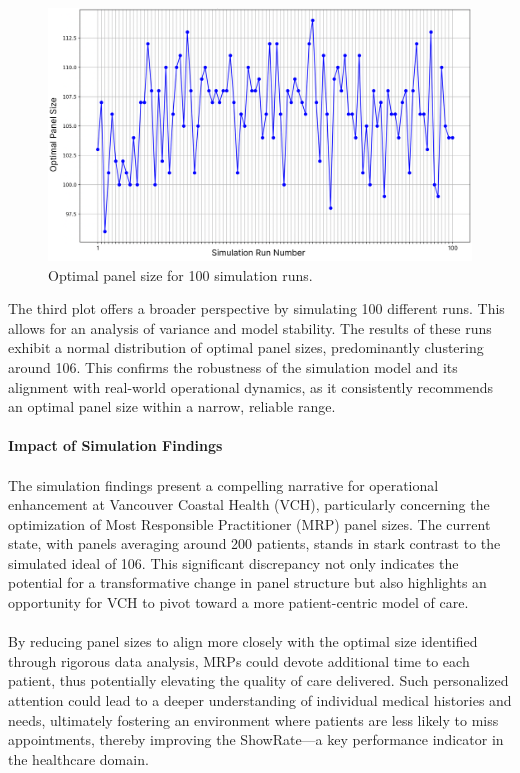 \documentclass[11pt]{article}
\theoremstyle{definition}
\begin{document}
\begin{figure}[H]
    \centering
    \includegraphics[width=1\textwidth]{sim100runs.png}
    \caption{Optimal panel size for 100 simulation runs.}
    \label{fig:show_rate}
\end{figure}
The third plot offers a broader perspective by simulating 100 different runs. This allows for an analysis of variance and model stability. The results of these runs exhibit a normal distribution of optimal panel sizes, predominantly clustering around 106. This confirms the robustness of the simulation model and its alignment with real-world operational dynamics, as it consistently recommends an optimal panel size within a narrow, reliable range.\\\\
\textbf{Impact of Simulation Findings}\\\\
The  simulation findings present a compelling narrative for operational enhancement at Vancouver Coastal Health (VCH), particularly concerning the optimization of Most Responsible Practitioner (MRP) panel sizes. The current state, with panels averaging around 200 patients, stands in stark contrast to the simulated ideal of 106. This significant discrepancy not only indicates the potential for a transformative change in panel structure but also highlights an opportunity for VCH to pivot toward a more patient-centric model of care.\\\\
By reducing panel sizes to align more closely with the optimal size identified through rigorous data analysis, MRPs could devote additional time to each patient, thus potentially elevating the quality of care delivered. Such personalized attention could lead to a deeper understanding of individual medical histories and needs, ultimately fostering an environment where patients are less likely to miss appointments, thereby improving the ShowRate—a key performance indicator in the healthcare domain.\\\\
\end{document}
